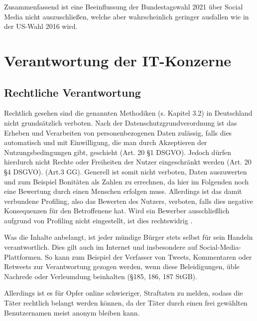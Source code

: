 Zusammenfassend ist eine Beeinflussung der Bundestagswahl 2021 über Social Media nicht auszuschließen, welche aber wahrscheinlich geringer ausfallen wie in der US-Wahl 2016 wird.


\section{Verantwortung der IT-Konzerne}

\subsection{Rechtliche Verantwortung}
Rechtlich gesehen sind die genannten Methodiken (s. Kapitel 3.2) in Deutschland nicht grundsätzlich verboten. Nach der Datenschutzgrundverordnung ist das Erheben und Verarbeiten von personenbezogenen Daten zulässig, falls dies automatisch und mit Einwilligung, die man durch Akzeptieren der Nutzungsbedingungen gibt, geschieht (Art. 20 \S 1 DSGVO). Jedoch dürfen hierdurch nicht Rechte oder Freiheiten der Nutzer eingeschränkt werden (Art. 20 \S 4 DSGVO).  (Art.3 GG). Generell ist somit nicht verboten, Daten auszuwerten und zum Beispiel Bonitäten als Zahlen zu errechnen, da hier im Folgenden noch eine Bewertung durch einen Menschen erfolgen muss\autocite[vgl.][7]{martini2017algorithmen}. Allerdings ist das damit verbundene Profiling, also das Bewerten des Nutzers, verboten, falls dies negative Konsequenzen für den Betroffenene hat. Wird ein Bewerber ausschließlich aufgrund von Profiling nicht eingestellt, ist dies rechtswidrig \autocite[vgl.][9]{martini2014big}.

Was die Inhalte anbelangt, ist jeder mündige Bürger stets selbst für sein Handeln verantwortlich. Dies gilt auch im Internet und insbesondere auf Social-Media-Plattformen. So kann zum Beispiel der Verfasser von Tweets, Kommentaren oder Retweets zur Verantwortung gezogen werden, wenn diese Beleidigungen, üble Nachrede oder Verleumdung beinhalten (\S 185, 186, 187 StGB).

Allerdings ist es für Opfer online schwieriger, Straftaten zu melden, sodass die Täter rechtlich belangt werden können, da der Täter durch einen frei gewählten Benutzernamen meist anonym bleiben kann.

